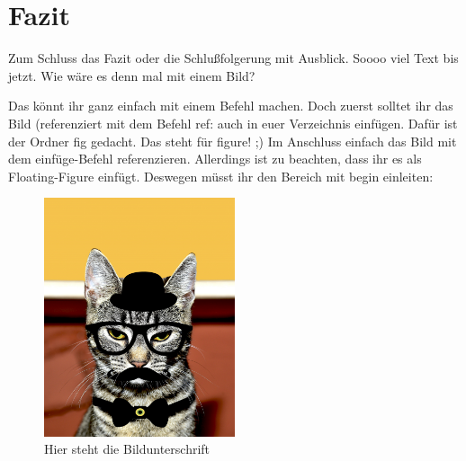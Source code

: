 \section{Fazit}\label{sec:fazit}
Zum Schluss das Fazit oder die Schlußfolgerung mit Ausblick.
Soooo viel Text bis jetzt. 
Wie wäre es denn mal mit einem Bild?

Das könnt ihr ganz einfach mit einem Befehl machen. Doch zuerst solltet ihr das Bild (referenziert mit dem Befehl ref:  auch in euer Verzeichnis einfügen. Dafür ist der Ordner fig gedacht. Das steht für figure! ;)
Im Anschluss einfach das Bild mit dem einfüge-Befehl referenzieren. Allerdings ist zu beachten, dass ihr es als Floating-Figure einfügt. Deswegen müsst ihr den Bereich mit begin einleiten:

\begin{figure}[tbp]
\centering %
\includegraphics[width=0.5\textwidth]{fig/mustacheCat} %
\caption{Hier steht die Bildunterschrift\label{fig:cat}} %
\end{figure}